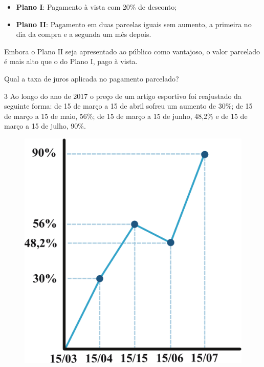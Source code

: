 \begin{itemize}
  \item \textbf{Plano I}: Pagamento à vista com 20\% de desconto;

  \item \textbf{Plano II}: Pagamento em duas parcelas iguais sem aumento, a primeira no dia da compra e a segunda um mês depois.
\end{itemize}

Embora o Plano II seja apresentado ao público como vantajoso, o valor
parcelado é mais alto que o do Plano I, pago à vista.

Qual a taxa de juros aplicada no pagamento parcelado?

\begin{emptybox}
\vspace{2cm}
\end{emptybox}

\pagebreak
\num{3} Ao longo do ano de 2017 o preço de um artigo esportivo foi
reajustado da seguinte forma: de 15 de março a 15 de abril sofreu um
aumento de 30\%; de 15 de março a 15 de maio, 56\%; de 15 de março a 15
de junho, 48,2\% e de 15 de março a 15 de julho, 90\%.

\begin{figure}[htpb!]
\centering
\includegraphics[width=.5\textwidth]{./ilustras-mat/modulo_4-atividade_3.png}
\end{figure}

